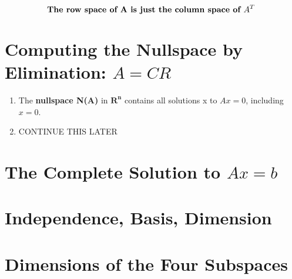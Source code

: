 \[
    \text{\textbf{The row space of A is just the column space of \(A^T\) }}
\]  



\section{Computing the Nullspace by Elimination: \(A = CR\) }

\begin{enumerate}
    \item The \textbf{nullspace N(A)} in \(\mathbf{R^n}\) contains all solutions x to \(Ax = 0\), including \(x = 0\).
    \item CONTINUE THIS LATER      
\end{enumerate}



\section{The Complete Solution to \(Ax = b\)}

\section{Independence, Basis, Dimension}

\section{Dimensions of the Four Subspaces}

